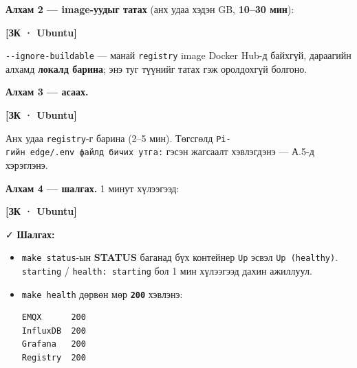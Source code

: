 \textbf{Алхам 2 --- image-уудыг татах} (анх удаа хэдэн GB, \textbf{10--30 мин}):

\textbf{{[}ЗК · Ubuntu{]}}

\begin{Shaded}
\begin{Highlighting}[]
\end{Highlighting}
\end{Shaded}

\texttt{-\/\allowbreak{}-ignore-buildable} --- манай \texttt{registry} image Docker Hub-д байхгүй, дараагийн алхамд \textbf{локалд барина}; энэ туг түүнийг татах гэж оролдохгүй болгоно.

\textbf{Алхам 3 --- асаах.}

\textbf{{[}ЗК · Ubuntu{]}}

\begin{Shaded}
\begin{Highlighting}[]
\end{Highlighting}
\end{Shaded}

Анх удаа \texttt{registry}-г барина (2--5 мин). Төгсгөлд \texttt{Pi-гийн\ edge/\allowbreak{}.\allowbreak{}env\ файлд\ бичих\ утга:\allowbreak{}} гэсэн жагсаалт хэвлэгдэнэ --- А.5-д хэрэглэнэ.

\textbf{Алхам 4 --- шалгах.} 1 минут хүлээгээд:

\textbf{{[}ЗК · Ubuntu{]}}

\begin{Shaded}
\begin{Highlighting}[]
\end{Highlighting}
\end{Shaded}

✓ \textbf{Шалгах:}

\begin{itemize}
\item
  \texttt{make\ status}-ын \textbf{STATUS} баганад бүх контейнер \texttt{Up} эсвэл \texttt{Up\ (healthy)}. \texttt{starting} / \texttt{health:\allowbreak{}\ starting} бол 1 мин хүлээгээд дахин ажиллуул.
\item
  \texttt{make\ health} дөрвөн мөр \textbf{\texttt{200}} хэвлэнэ:

\begin{verbatim}
EMQX      200
InfluxDB  200
Grafana   200
Registry  200
\end{verbatim}
\end{itemize}

